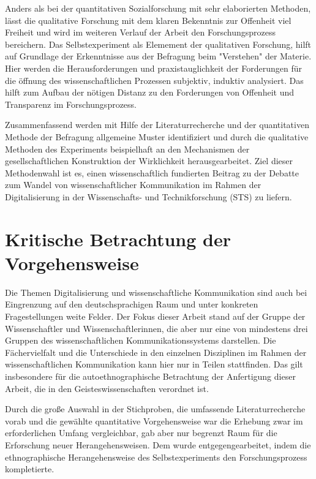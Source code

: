 Anders als bei der quantitativen Sozialforschung mit sehr elaborierten Methoden,
lässt die qualitative Forschung mit dem klaren Bekenntnis zur Offenheit viel Freiheit und wird im weiteren Verlauf der Arbeit den Forschungsprozess bereichern. Das Selbstexperiment als Elemement der qualitativen Forschung, hilft auf Grundlage der Erkenntnisse aus der Befragung beim "Verstehen" der Materie. Hier werden die Herausforderungen und praxistauglichkeit der Forderungen für die öffnung des wissenschaftlichen Prozessen subjektiv, induktiv analysiert. Das hilft zum Aufbau der nötigen Distanz zu den Forderungen von Offenheit und Transparenz im Forschungsprozess.

Zusammenfassend werden mit Hilfe der Literaturrecherche und der quantitativen Methode der Befragung allgemeine Muster identifiziert und durch die qualitative Methoden des Experiments beispielhaft an den Mechanismen der gesellschaftlichen Konstruktion der Wirklichkeit herausgearbeitet. Ziel dieser Methodenwahl ist es, einen wissenschaftlich fundierten Beitrag zu der Debatte zum Wandel von wissenschaftlicher Kommunikation im Rahmen der Digitalisierung in der Wissenschafts- und Technikforschung (STS) zu liefern.

\section{Kritische Betrachtung der Vorgehensweise}

Die Themen Digitalisierung und wissenschaftliche Kommunikation sind auch bei Eingrenzung auf den deutschsprachigen Raum und unter konkreten Fragestellungen weite Felder. Der Fokus dieser Arbeit stand auf der Gruppe der Wissenschaftler und Wissenschaftlerinnen, die aber nur eine von mindestens drei Gruppen des wissenschaftlichen Kommunikationssystems darstellen. Die Fächervielfalt und die Unterschiede in den einzelnen Disziplinen im Rahmen der wissenschaftlichen Kommunikation kann hier nur in Teilen stattfinden. Das gilt insbesondere für die autoethnographische Betrachtung der Anfertigung dieser Arbeit, die in den Geisteswissenschaften verordnet ist.

Durch die große Auswahl in der Stichproben, die umfassende Literaturrecherche vorab und die gewählte quantitative Vorgehensweise war die Erhebung zwar im erforderlichen Umfang vergleichbar, gab aber nur begrenzt Raum für die Erforschung neuer Herangehensweisen. Dem wurde entgegengearbeitet, indem die ethnographische Herangehensweise des Selbstexperiments den Forschungsprozess kompletierte.

